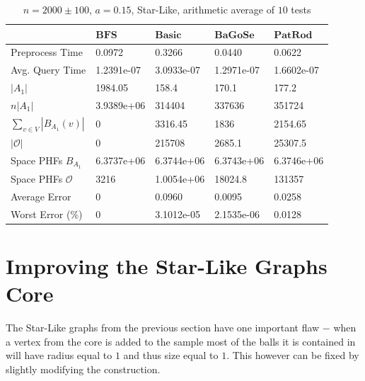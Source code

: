 \documentclass[shortabstract, lic, english]{iithesis}
\theoremstyle{definition} \newtheorem{definition}{Definition}[chapter]
\theoremstyle{plain} \newtheorem{remark}[definition]{Observation}
\theoremstyle{plain} \newtheorem{theorem}[definition]{Theorem}
\theoremstyle{plain} \newtheorem{lemma}[definition]{Lemma}
\theoremstyle{plain} \newtheorem{conjecture}[definition]{Conjecture}
\begin{document}
\begin{table}[H]
    \centering
    \begin{tabular}{ |p{3cm}||p{2cm}|p{2cm}|p{2cm}|p{2cm}|  } 
        \hline
        & $\mathbf{BFS}$ & $\mathbf{Basic}$ & $\mathbf{BaGoSe}$ & $\mathbf{PatRod}$ \\
        \hline
        \hline
        Preprocess Time                 & 0.0972     & 0.3266     & 0.0440      & 0.0622     \\
        \hline
        Avg. Query Time                 & 1.2391e-07 & 3.0933e-07 & 1.2971e-07  & 1.6602e-07 \\
        \hline
        $|A_1|$                         & 1984.05    & 158.4      & 170.1       & 177.2      \\
        \hline
        $n  |A_1|$                     & 3.9389e+06 & 314404     & 337636      & 351724     \\
        \hline
        $\sum_{v \in V} |B_{A_1}(v)| $  & 0          & 3316.45    & 1836        & 2154.65    \\
        \hline
        $|\mathcal{O}|$                 & 0          & 215708     & 2685.1      & 25307.5    \\
        \hline
        Space PHFs $B_{A_1}$            & 6.3737e+06 & 6.3744e+06 & 6.3743e+06  & 6.3746e+06 \\
        \hline
        Space PHFs $\mathcal{O}$        & 3216       & 1.0054e+06 & 18024.8     & 131357     \\
        \hline
        Average Error                   & 0          & 0.0960     & 0.0095      & 0.0258     \\
        \hline
        Worst Error (\%)                & 0          & 3.1012e-05 & 2.1535e-06  & 0.0128     \\
        \hline

    \end{tabular}
    \caption{$n = 2000 \pm 100$, $a = 0.15$, Star-Like, arithmetic average of $10$ tests}
\end{table}

\section{Improving the Star-Like Graphs Core}

The Star-Like graphs from the previous section have one important flaw $-$
when a vertex from the core is added to the sample most of the balls it is contained in will have radius equal to $1$ and thus size equal to $1$.
This however can be fixed by slightly modifying the construction.
\end{document}
